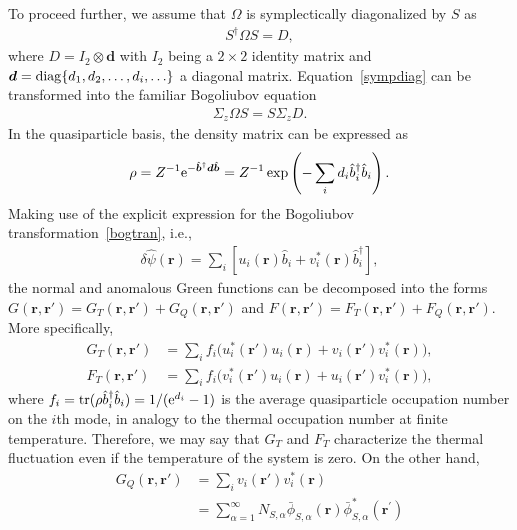 \documentclass[pra,twocolumn,preprintnumbers,superscriptaddress,longbibliography,showkeys]{revtex4-1}
\begin{document}
To proceed further, we assume that $\Omega$ is symplectically diagonalized by $S$ as
\begin{align}
S^\dagger\Omega S=D,\label{sympdiag}
\end{align}
where $D=I_2\otimes {\boldsymbol d}$ with $I_2$ being a $2\times 2$ identity matrix and ${\boldsymbol d}={\rm diag}\{d_1,d_2,\ldots,d_i,\ldots\}$ a diagonal matrix. Equation~\eqref{sympdiag} can be transformed into the familiar Bogoliubov equation
\begin{align}
\Sigma_z\Omega S=S\Sigma_z D.
\end{align}
In the quasiparticle basis, the density matrix can be expressed as
\begin{align}
\rho=Z^{-1}{\rm e}^{-\hat {\boldsymbol b}^\dagger {\boldsymbol d}\hat {\boldsymbol b}}=Z^{-1}\exp\left({-\sum_i d_i\hat b_i^\dag \hat b_i}\right).
\end{align}
Making use of the explicit expression for the Bogoliubov transformation~\eqref{bogtran}, i.e.,
\begin{align}
\delta\hat{\psi}({\bm r})=\sum_i\left[u_i({\bm r}) \hat b_i+v_i^*({\bm r}) \hat b_i^\dag\right],
\end{align}
the normal and anomalous Green functions can be decomposed into the forms $G({\bm r}, {\bm r}') = G_{T}({\bm r}, {\bm r}') + G_{Q}({\bm r}, {\bm r}')$ and $F({\bm r}, {\bm r}') = F_{T}({\bm r}, {\bm r}') + F_{Q}({\bm r}, {\bm r}')$. More specifically,
\begin{align}
G_{T}({\bm r}, {\bm r}')&=\sum_{i} f_i \Big( u^{\ast}_{i}({\bm r}')u_{i}({\bm r}) + v_{i}({\bm r}')v^{\ast}_{i}({\bm r}) \Big),\\
F_{T}({\bm r}, {\bm r}')&=\sum_{i} f_{i}\Big( v^{\ast}_{i}({\bm r}') u_{i}({\bm r}) + u_{i}({\bm r}') v^{\ast}_{i}({\bm r}) \Big),
\end{align}
where $f_{i}={\rm tr}(\rho\hat{b}_i^\dagger\hat{b}_i)=1/({\rm e}^{d_i}-1)$ is the average quasiparticle occupation number on the $i$th mode, in analogy to the thermal occupation number at finite temperature. Therefore, we may say that $G_T$ and $F_T$ characterize the thermal fluctuation even if the temperature of the system is zero. On the other hand,
\begin{align}
G_Q({\bm r}, {\bm r}') &= \sum_{i} v_{i}({\bm r}') v^{\ast}_{i}({\bm r})\nonumber\\
&={\sum_{\alpha=1}^{\infty }N_{S,\alpha}\bar{\phi}_{S,\alpha}({\bm r})\bar{\phi}_{S,\alpha}^{\ast }({\bm r}^{\prime })}\label{gsqu}
\end{align}
\end{document}
